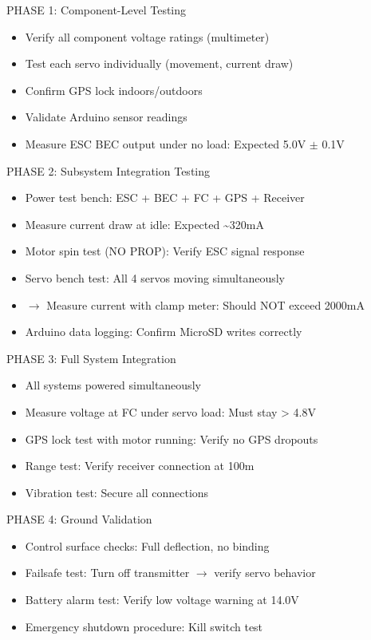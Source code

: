 \documentclass[11pt,letterpaper]{article}
\begin{document}
PHASE 1: Component-Level Testing\par

\begin{itemize}
  \item Verify all component voltage ratings (multimeter)
  \item Test each servo individually (movement, current draw)
  \item Confirm GPS lock indoors/outdoors
  \item Validate Arduino sensor readings
  \item Measure ESC BEC output under no load: Expected 5.0V $\pm$ 0.1V
\end{itemize}

PHASE 2: Subsystem Integration Testing\par

\begin{itemize}
  \item Power test bench: ESC + BEC + FC + GPS + Receiver
  \item Measure current draw at idle: Expected \textasciitilde{}320mA
  \item Motor spin test (NO PROP): Verify ESC signal response
  \item Servo bench test: All 4 servos moving simultaneously
  \item $\rightarrow$ Measure current with clamp meter: Should NOT exceed 2000mA
  \item Arduino data logging: Confirm MicroSD writes correctly
\end{itemize}

PHASE 3: Full System Integration\par

\begin{itemize}
  \item All systems powered simultaneously
  \item Measure voltage at FC under servo load: Must stay > 4.8V
  \item GPS lock test with motor running: Verify no GPS dropouts
  \item Range test: Verify receiver connection at 100m
  \item Vibration test: Secure all connections
\end{itemize}

PHASE 4: Ground Validation\par

\begin{itemize}
  \item Control surface checks: Full deflection, no binding
  \item Failsafe test: Turn off transmitter $\rightarrow$ verify servo behavior
  \item Battery alarm test: Verify low voltage warning at 14.0V
  \item Emergency shutdown procedure: Kill switch test
\end{itemize}
\end{document}
